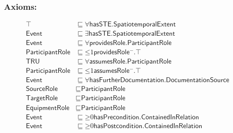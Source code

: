 \subsubsection*{Axioms:}
\begin{align}
    \top &\sqsubseteq \forall\textsf{hasSTE.SpatiotemporalExtent}\\
    \textsf{Event} &\sqsubseteq \exists\textsf{hasSTE.SpatiotemporalExtent}\\
    \textsf{Event} &\sqsubseteq \forall\textsf{providesRole.ParticipantRole}\\
    \textsf{ParticipantRole} &\sqsubseteq \mathord{\leq} 1 \textsf{providesRole}\mathord{^-}.\top\\
    \textsf{TRU} &\sqsubseteq \forall\textsf{assumesRole.ParticipantRole}\\
    \textsf{ParticipantRole} &\sqsubseteq \mathord{\leq} 1 \textsf{assumesRole}\mathord{^-}.\top\\
    \textsf{Event} &\sqsubseteq \forall\textsf{hasFurtherDocumentation.DocumentationSource} \\
    \textsf{SourceRole} &\sqsubseteq \textsf{ParticipantRole}\\
    \textsf{TargetRole} &\sqsubseteq \textsf{ParticipantRole}\\
    \textsf{EquipmentRole} &\sqsubseteq \textsf{ParticipantRole}\\
    \textsf{Event} &\sqsubseteq \mathord{\geq}0\textsf{hasPrecondition.ContainedInRelation}\\
    \textsf{Event} &\sqsubseteq \mathord{\geq}0\textsf{hasPostcondition.ContainedInRelation}
\end{align}

